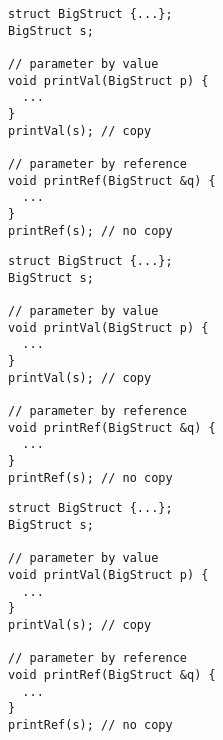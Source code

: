 \begin{frame}[fragile]
  \begin{multicols}{2}
    \begin{overprint}[\columnwidth]
      \begin{verbatim}
struct BigStruct {...};
BigStruct s;

// parameter by value
void printVal(BigStruct p) {
  ...
}
printVal(s); // copy

// parameter by reference
void printRef(BigStruct &q) {
  ...
}
printRef(s); // no copy
      \end{verbatim}
      \begin{verbatim}
struct BigStruct {...};
BigStruct s;

// parameter by value
void printVal(BigStruct p) {
  ...
}
printVal(s); // copy

// parameter by reference
void printRef(BigStruct &q) {
  ...
}
printRef(s); // no copy
      \end{verbatim}
      \begin{verbatim}
struct BigStruct {...};
BigStruct s;

// parameter by value
void printVal(BigStruct p) {
  ...
}
printVal(s); // copy

// parameter by reference
void printRef(BigStruct &q) {
  ...
}
printRef(s); // no copy
      \end{verbatim}
    \end{overprint}
    \columnbreak
    \null \vfill
    \vfill \null
  \end{multicols}
\end{frame}

